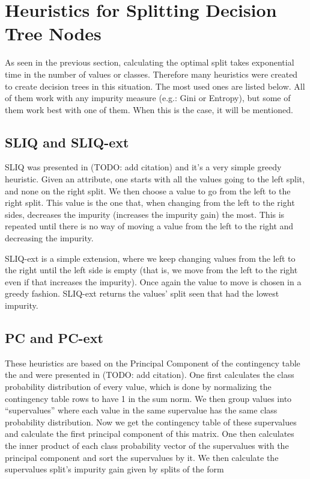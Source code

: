 \section{Heuristics for Splitting Decision Tree Nodes}
As seen in the previous section, calculating the optimal split takes exponential time in the number of values or classes. Therefore many heuristics were created to create decision trees in this situation. The most used ones are listed below. All of them work with any impurity measure (e.g.: Gini or Entropy), but some of them work best with one of them. When this is the case, it will be mentioned.

\subsection{SLIQ and SLIQ-ext}
SLIQ was presented in (TODO: add citation) and it's a very simple greedy heuristic. Given an attribute, one starts with all the values going to the left split, and none on the right split. We then choose a value to go from the left to the right split. This value is the one that, when changing from the left to the right sides, decreases the impurity (increases the impurity gain) the most. This is repeated until there is no way of moving a value from the left to the right and decreasing the impurity.

SLIQ-ext is a simple extension, where we keep changing values from the left to the right until the left side is empty (that is, we move from the left to the right even if that increases the impurity). Once again the value to move is chosen in a greedy fashion. SLIQ-ext returns the values' split seen that had the lowest impurity.

\subsection{PC and PC-ext}
These heuristics are based on the Principal Component of the contingency table the and were presented in (TODO: add citation). One first calculates the class probability distribution of every value, which is done by normalizing the contingency table rows to have 1 in the sum norm. We then group values into ``supervalues'' where each value in the same supervalue has the same class probability distribution. Now we get the contingency table of these supervalues and calculate the first principal component of this matrix. One then calculates the inner product of each class probability vector of the supervalues  with the principal component and sort the supervalues by it. We then calculate the supervalues split's impurity gain given by splits of the form

